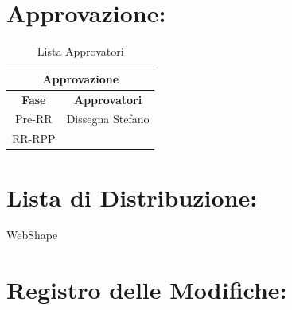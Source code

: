 \section*{\LARGE Approvazione:}

\begin{table}[!h]
	\begin{center}
		\begin{tabular}
			{|c|c|}
			\hline
			\multicolumn{2}{|c|}{ \textbf{Approvazione} } \\
			\hline
			\textbf{Fase} & \textbf{Approvatori} \\
			\hline
			{Pre-RR} & Dissegna Stefano \\
			\hline
			{RR-RPP} & \\
			\hline
		\end{tabular}
		\caption{Lista Approvatori} %
		\label{tabapprovazione}
	\end{center}
\end{table}
\textbf{}

\section*{\LARGE Lista di Distribuzione:}

	\begin{elenconumerato}{\normindent}
		\item WebShape 
	\end{elenconumerato}

\newpage


\section*{\LARGE Registro delle Modifiche:}

